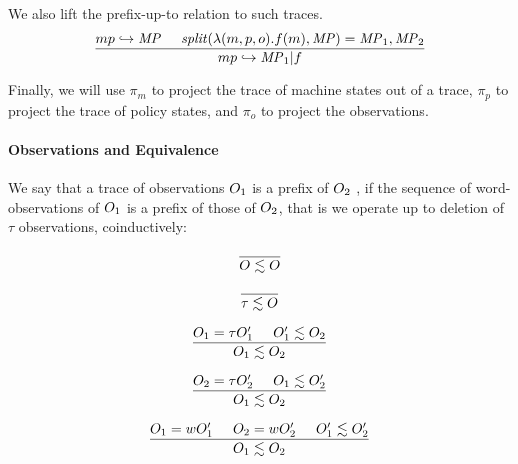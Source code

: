 \documentclass[acmsmall,review,anonymous]{acmart}\settopmatter{printfolios=true,printccs=false,printacmref=false}
\begin{document}
We also lift the prefix-up-to relation to such traces.
  \[\frac{mp \hookrightarrow \mathit{MP} \hspace{.5cm}
            \mathit{split}(\lambda (m,p,o).f(m),\mathit{MP}) = \mathit{MP}_1,\mathit{MP}_2}
         {mp \hookrightarrow \mathit{MP}_1 | f}\]

Finally, we will use \(\pi_m\) to project the trace of machine states
out of a trace, \(\pi_p\) to project the trace of policy states, and
\(\pi_o\) to project the observations.
       

\paragraph*{Observations and Equivalence}

We say that a trace of observations $O_1$ is a prefix of $O_2$
, if the
sequence of word-observations of $O_1$ is a prefix of those of
$O_2$, that is we operate up to deletion of \(\tau\) observations, coinductively:

\[\frac{} {O \lesssim O}\]

\[\frac{} {\tau \lesssim O}\]

\[\frac{O_1 = \tau O_1' \hspace{.5cm} O_1' \lesssim O_2}
       {O_1 \lesssim O_2}\]

\[\frac{O_2 = \tau O_2' \hspace{.5cm} O_1 \lesssim O_2'}
       {O_1 \lesssim O_2}\]

\[\frac{O_1 = w O_1' \hspace{.5cm} O_2 = w O_2' \hspace{.5cm} O_1' \lesssim O_2'}
       {O_1 \lesssim O_2}\]
\end{document}
